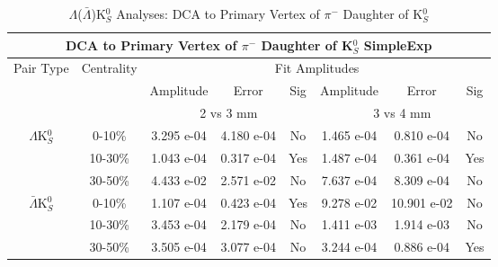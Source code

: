 \documentclass[../AnalysisNoteJBuxton.tex]{subfiles}
\begin{document}
\begin{table}
 \centering
 \begin{tabular}{|c|c|c|c|c||c|c|c|}
  \multicolumn{8}{c}{DCA to Primary Vertex of $\pi^{-}$ Daughter of K$^{0}_{S}$ SimpleExp} \\
  \hline
  \multirow{3}{*}{Pair Type} & \multirow{3}{*}{Centrality} & \multicolumn{6}{c|}{Fit Amplitudes} \\
  \cline{3-8}
   & & Amplitude & Error & Sig & Amplitude & Error & Sig \\  
  \cline{3-8}
   & & \multicolumn{3}{c||}{2 vs 3 mm} & \multicolumn{3}{c|}{3 vs 4 mm} \\  
  \hline  
  \multirow{3}{*}{$\Lambda$K$^{0}_{S}$}  
   &  0-10\% & 3.295 e-04 & 4.180 e-04 & No & 1.465 e-04 & 0.810 e-04 & No \\
   & 10-30\% & 1.043 e-04 & 0.317 e-04 & Yes & 1.487 e-04 & 0.361 e-04 & Yes \\
   & 30-50\% & 4.433 e-02 & 2.571 e-02 & No & 7.637 e-04 & 8.309 e-04 & No \\
  \hline  
  \multirow{3}{*}{$\bar{\Lambda}$K$^{0}_{S}$}  
   &  0-10\% & 1.107 e-04 & 0.423 e-04 & Yes & 9.278 e-02 & 10.901 e-02 & No \\
   & 10-30\% & 3.453 e-04 & 2.179 e-04 & No & 1.411 e-03 & 1.914 e-03 & No \\
   & 30-50\% & 3.505 e-04 & 3.077 e-04 & No & 3.244 e-04 & 0.886 e-04 & Yes \\
  \hline
 \end{tabular}
 \caption{$\Lambda$($\bar{\Lambda}$)K$^{0}_{S}$ Analyses: DCA to Primary Vertex of $\pi^{-}$ Daughter of K$^{0}_{S}$}
 \label{tab:DcaToPrimVertexNegPionDaughtOfK0LamK0_SimpleExp}
\end{table}
\end{document}
